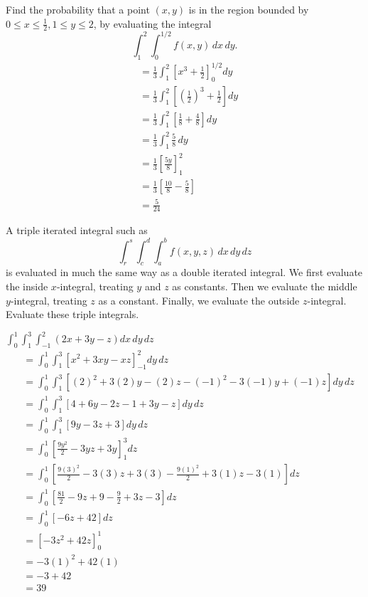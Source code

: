 \documentclass[12pt]{article}
\newenvironment{problem}[2][]{
    \begin{trivlist}
        \item[
            {\bfseries #1}
            {\bfseries #2.}
        ]
}{\end{trivlist}}
\begin{document}
\begin{problem}{18}
    Find the probability that a point $(x, y)$ is in the region bounded by $0 \leq x \leq \frac{1}{2}, 1 \leq y \leq 2$, by evaluating the integral $$\int_1^2 \int_0^{1/2} f(x,y) \, dx \, dy.$$
    \begin{align}
        &= \frac{1}{3} \int_1^2 \left[x^3 + \frac{1}{2}\right]_0^{1/2} dy \\
        &= \frac{1}{3} \int_1^2 \left[\left(\frac{1}{2}\right)^3 + \frac{1}{2}\right] dy \\
        &= \frac{1}{3} \int_1^2 \left[\frac{1}{8} + \frac{4}{8}\right] dy \\
        &= \frac{1}{3} \int_1^2 \frac{5}{8} \, dy \\
        &= \frac{1}{3} \left[\frac{5y}{8}\right]_1^2 \\
        &= \frac{1}{3} \left[\frac{10}{8} - \frac{5}{8}\right] \\
        &= \frac{5}{24}
    \end{align}
\end{problem}

\clearpage

\noindent A triple iterated integral such as $$\int_r^s \int_c^d \int_a^b f (x, y, z) \, dx \, dy \, dz$$ is evaluated in much the same way as a double iterated integral.
We first evaluate the inside $x$-integral, treating $y$ and $z$ as constants.
Then we evaluate the middle $y$-integral, treating $z$ as a constant.
Finally, we evaluate the outside $z$-integral.
Evaluate these triple integrals.

\begin{problem}{21}
    $\displaystyle\int_0^1 \displaystyle\int_1^3 \displaystyle\int_{-1}^2 \left(2x + 3y - z\right) dx \, dy \, dz$
    \begin{align}
        &= \int_0^1 \int_1^3 \left[x^2 + 3xy - xz\right]_{-1}^2 dy \, dz \\
        &= \int_0^1 \int_1^3 \left[\left(2\right)^2 + 3 \left(2\right) y - \left(2\right) z - \left(-1\right)^2 - 3 \left(-1\right) y + \left(-1\right) z\right] dy \, dz \\
        &= \int_0^1 \int_1^3 \left[4 + 6y - 2z - 1 + 3y - z\right] dy \, dz \\
        &= \int_0^1 \int_1^3 \left[9y - 3z + 3\right] dy \, dz \\
        &= \int_0^1 \left[\frac{9y^2}{2} - 3yz + 3y\right]_1^3 dz \\
        &= \int_0^1 \left[\frac{9 \left(3\right)^2}{2} - 3 \left(3\right) z + 3 \left(3\right) - \frac{9 \left(1\right)^2}{2} + 3 \left(1\right) z - 3 \left(1\right)\right] dz \\
        &= \int_0^1 \left[\frac{81}{2} - 9z + 9 - \frac{9}{2} + 3z - 3\right] dz \\
        &= \int_0^1 \left[-6z + 42\right] dz \\
        &= \left[-3z^2 + 42z\right]_0^1 \\
        &= -3 \left(1\right)^2 + 42 \left(1\right) \\
        &= -3 + 42 \\
        &= 39
    \end{align}
\end{problem}
\end{document}
